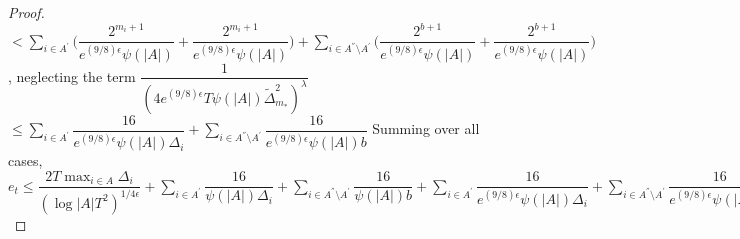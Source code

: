 \begin{proof}
\newline
\hspace*{0em}$<\sum_{i\in A^{'}}\bigg(\dfrac{2^{m_{i}+1}}{e^{(9/8)\epsilon}\psi(|A|)}+\dfrac{2^{m_{i}+1}}{e^{(9/8)\epsilon}\psi(|A|)}\bigg)+\sum_{i\in A^{''}\setminus A^{'}}\bigg(\dfrac{2^{b+1}}{e^{(9/8)\epsilon}\psi(|A|)}+\dfrac{2^{b+1}}{e^{(9/8)\epsilon}\psi(|A|)}\bigg)$, neglecting the term $\dfrac{1}{(4e^{(9/8)\epsilon}T\psi(|A|)\tilde{\Delta}_{m_{*}}^{2})^{\lambda}}$
\newline
\hspace*{0em}$\leq\sum_{i\in A^{'}}\dfrac{16}{e^{(9/8)\epsilon}\psi(|A|)\Delta_{i}}+\sum_{i\in A^{''}\setminus A^{'}}\dfrac{16}{e^{(9/8)\epsilon}\psi(|A|)b}$
\newline
Summing over all cases,
$e_{t}\leq \dfrac{2T\max_{i\in A}{\Delta_{i}}}{(\log |A|T^{2})^{1/4\epsilon}} + \sum_{i\in A^{'}}\dfrac{16}{\psi(|A|)\Delta_{i}}+\sum_{i\in A^{''}\setminus A^{'}}\dfrac{16}{\psi(|A|)b}+
\sum_{i\in A^{'}}\dfrac{16}{e^{(9/8)\epsilon}\psi(|A|)\Delta_{i}}+\sum_{i\in A^{''}\setminus A^{'}}\dfrac{16}{e^{(9/8)\epsilon}\psi(|A|)b}$
\end{proof}